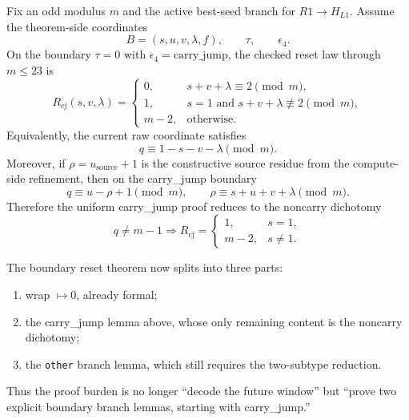 \begin{proposition}
Fix an odd modulus \(m\) and the active best-seed branch for \(R1\to H_{L1}\).
Assume the theorem-side coordinates
\[
B=(s,u,v,\lambda,f),\qquad \tau,\qquad \epsilon_4.
\]
On the boundary \(\tau=0\) with \(\epsilon_4=\mathrm{carry\_jump}\), the checked reset law
through \(m\le 23\) is
\[
R_{\mathrm{cj}}(s,v,\lambda)=
\begin{cases}
0,& s+v+\lambda\equiv 2 \pmod m,\\
1,& s=1 \text{ and } s+v+\lambda\not\equiv 2 \pmod m,\\
m-2,& \text{otherwise.}
\end{cases}
\]
Equivalently, the current raw coordinate satisfies
\[
q\equiv 1-s-v-\lambda \pmod m.
\]
Moreover, if \(\rho=u_{\mathrm{source}}+1\) is the constructive source residue from the
compute-side refinement, then on the carry\_jump boundary
\[
q\equiv u-\rho+1 \pmod m,
\qquad
\rho\equiv s+u+v+\lambda \pmod m.
\]
Therefore the uniform carry\_jump proof reduces to the noncarry dichotomy
\[
q\neq m-1
\Longrightarrow
R_{\mathrm{cj}}=
\begin{cases}
1,& s=1,\\
m-2,& s\neq 1.
\end{cases}
\]
\end{proposition}

\begin{remark}
The boundary reset theorem now splits into three parts:
\begin{enumerate}
\item wrap \(\mapsto 0\), already formal;
\item the carry\_jump lemma above, whose only remaining content is the noncarry dichotomy;
\item the \texttt{other} branch lemma, which still requires the two-subtype reduction.
\end{enumerate}
Thus the proof burden is no longer ``decode the future window'' but ``prove two explicit
boundary branch lemmas, starting with carry\_jump.''
\end{remark}
